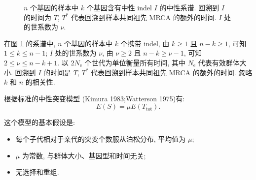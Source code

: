 \documentclass[12pt]{article}
\begin{document}
\begin{figure}
    \caption{
        $n$ 个基因的样本中 $k$ 个基因含有中性 indel $I$ 的中性系谱.
        回溯到 $I$ 的时间为 $T$, $T^*$ 代表回溯到样本共同祖先 MRCA 的额外的时间.
        $I$ 处的世系数为 $\nu$.
    }
    \label{fig:1}
\end{figure}

在图 \ref{fig:1} 的系谱中, $n$ 个基因的样本中 $k$ 个携带 indel,
由 $k \geq 1$ 且 $n-k \geq 1$, 可知 $1 \leq k \leq n-1$;
$I$ 处的世系数为 $\nu$, 由 $\nu \geq 2$ 且 $n-k \geq \nu - 1$, 可知 $2 \leq \nu \leq n-k+1$.
以 $2N_\text{e}$ 个世代为单位衡量所有时间, 其中 $N_\text{e}$ 代表有效群体大小.
回溯到 $I$ 的时间是 $T$, $T^*$ 代表回溯到样本共同祖先 MRCA 的额外的时间.
忽略 $k$ 和 $n$ 的相关性.

根据标准的中性突变模型 (Kimura 1983;Watterson 1975)有:
\begin{equation} \label{eq:1}
    E(S) = \mu E(T_{\text{tot}})
    \text{.}
\end{equation}

这个模型的基本假设是:
\begin{itemize}[leftmargin=4em]
    \item 每个子代相对于亲代的突变个数服从泊松分布, 平均值为 $\mu$;
    \item $\mu$ 为常数, 与群体大小、基因型和时间无关;
    \item 无选择和重组.
\end{itemize}
\end{document}
